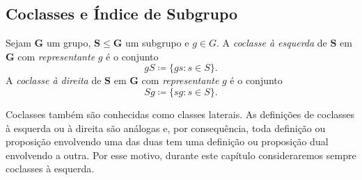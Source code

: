 \subsection{Coclasses e Índice de Subgrupo}

\begin{defi}
Sejam $\bm G$ um grupo, $\bm S \leq \bm G$ um subgrupo e $g \in G$. A \emph{coclasse à esquerda} de $\bm S$ em $\bm G$ com \emph{representante} $g$ é o conjunto
	\begin{equation*}
	gS \coloneqq \{gs:s \in S\}.
	\end{equation*}
A \emph{coclasse à direita} de $\bm S$ em $\bm G$ com \emph{representante} $g$ é o conjunto
	\begin{equation*}
	Sg \coloneqq \{sg:s \in S\}.
	\end{equation*}
\end{defi}

Coclasses também são conhecidas como classes laterais. As definições de coclasses à esquerda ou à direita são análogas e, por consequência, toda definição ou proposição envolvendo uma das duas tem uma definição ou proposição dual envolvendo a outra. Por esse motivo, durante este capítulo consideraremos sempre coclasses à esquerda.

